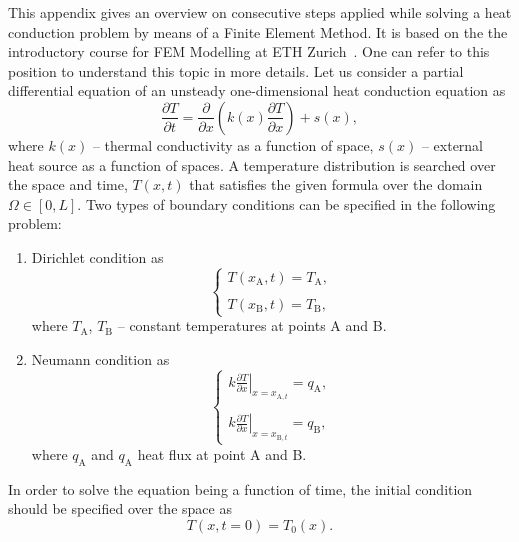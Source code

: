 
This appendix gives an overview on consecutive steps applied while solving a heat conduction problem by means of a Finite Element Method. It is based on the the introductory course for FEM Modelling at ETH Zurich~\cite{eth_introduction_to_finite_element}. One can refer to this position to understand this topic in more details. Let us consider a partial differential equation of an unsteady one-dimensional heat conduction equation as 
\begin{equation}
    \frac{\partial T}{\partial t} = \frac{\partial}{\partial x} \left(k(x) \frac{\partial T}{\partial x} \right) + s(x), 
    \label{eqn:heat_conduction_pde}
\end{equation}
where $k(x)$ -- thermal conductivity as a function of space, $s(x)$ -- external heat source as a function of spaces. A temperature distribution is searched over the space and time, $T(x, t)$ that satisfies the given formula over the domain $\Omega \in \left[ 0, L \right]$. Two types of boundary conditions can be specified in the following problem: 
\begin{enumerate}
    \item 
    Dirichlet condition as \begin{equation}
    \left\{ \begin{array}{ lll }
    T(x_\text{A}, t) = T_\text{A},  \\ \\
    T(x_\text{B}, t) = T_\text{B},
    \end{array} \right.
    \end{equation}
    where $T_\text{A}$, $T_\text{B}$ -- constant temperatures at points A and B.
    
    \item Neumann condition as 
    \begin{equation}
    \left\{ \begin{array}{ lll }
    \left. k \frac{\partial T}{\partial x} \right|_{x=x_{\text{A},t}} = q_\text{A}, \\ \\
    \left. k \frac{\partial T}{\partial x} \right|_{x=x_{\text{B},t}} = q_\text{B},
    \end{array} \right.
    \label{eqn:neumann_bcs}
    \end{equation}
    where $q_\text{A}$ and $q_\text{A}$ heat flux at point A and B.
\end{enumerate}

In order to solve the equation being a function of time, the initial condition should be specified over the space as 
\begin{equation}
    T(x, t=0) = T_0(x).
\end{equation}

